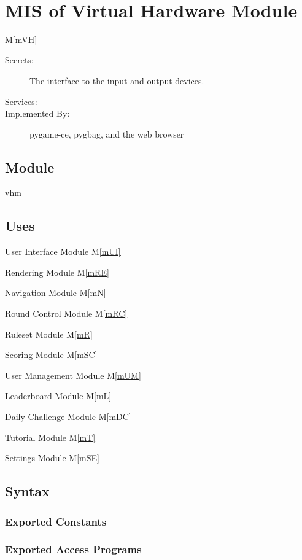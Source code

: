 \documentclass[12pt, titlepage]{article}
\newcommand{\mref}[1]{M\ref{#1}}
\begin{document}
\newpage
~\newpage

\section{MIS of Virtual Hardware Module} \mref{mVH} 

\begin{description}
\item[Secrets:] The interface to the input and output devices.
\item[Services:]
\item[Implemented By:] pygame-ce, pygbag, and the web browser
\end{description}

\subsection{Module}

vhm

\subsection{Uses}

User Interface Module \mref{mUI}

Rendering Module \mref{mRE}

Navigation Module \mref{mN}

Round Control Module \mref{mRC}

Ruleset Module \mref{mR}

Scoring Module \mref{mSC}

User Management Module \mref{mUM}

Leaderboard Module \mref{mL}

Daily Challenge Module \mref{mDC}

Tutorial Module \mref{mT}

Settings Module \mref{mSE}


\subsection{Syntax}

\subsubsection{Exported Constants}



\subsubsection{Exported Access Programs}
\end{document}
